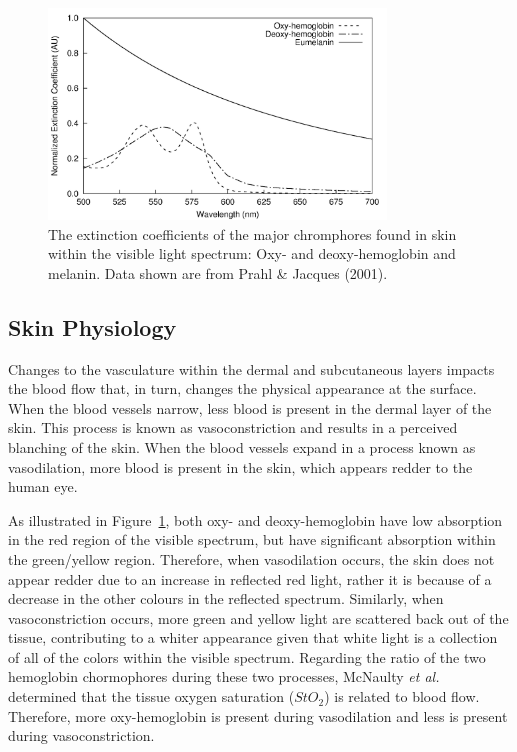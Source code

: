 \begin{figure}
	\centering \includegraphics[width=0.8\textwidth]{figures/intro-skin_chromophores.png}
	\caption[The extinction coefficient spectra for the major chromophores of skin within the visible light spectrum]{\label{fig:intro-skin_chromophores}The extinction coefficients of the major chromphores found in skin within the visible light spectrum: Oxy- and deoxy-hemoglobin and melanin. Data shown are from Prahl \& Jacques (2001).\cite{Prahl2001}}
\end{figure}

\subsection{Skin Physiology}
Changes to the vasculature within the dermal and subcutaneous layers impacts the blood flow that, in turn, changes the physical appearance at the surface. When the blood vessels narrow, less blood is present in the dermal layer of the skin. This process is known as vasoconstriction and results in a perceived blanching of the skin. When the blood vessels expand in a process known as vasodilation, more blood is present in the skin, which appears redder to the human eye.

As illustrated in Figure~\ref{fig:intro-skin_chromophores}, both oxy- and deoxy-hemoglobin have low absorption in the red region of the visible spectrum, but have significant absorption within the green/yellow region. Therefore, when vasodilation occurs, the skin does not appear redder due to an increase in reflected red light, rather it is because of a decrease in the other colours in the reflected spectrum. Similarly, when vasoconstriction occurs, more green and yellow light are scattered back out of the tissue, contributing to a whiter appearance given that white light is a collection of all of the colors within the visible spectrum. Regarding the ratio of the two hemoglobin chormophores during these two processes, McNaulty \emph{et al.} determined that the tissue oxygen saturation ($StO_2$) is related to blood flow.\cite{McNulty2011} Therefore, more oxy-hemoglobin is present during vasodilation and less is present during vasoconstriction.

